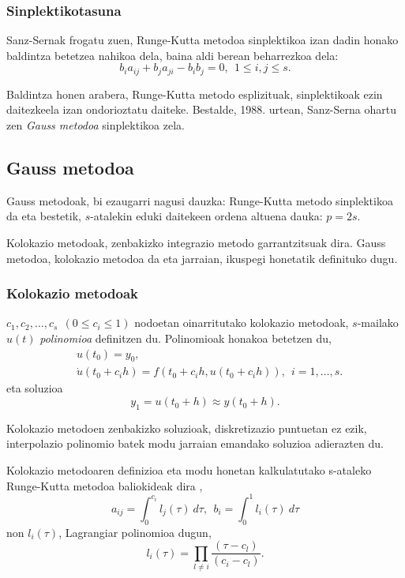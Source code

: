 \subsubsection*{Sinplektikotasuna}

Sanz-Sernak  \cite{JMSanz-Serna1994} frogatu zuen,  Runge-Kutta metodoa sinplektikoa izan dadin honako baldintza betetzea nahikoa dela, baina aldi berean beharrezkoa dela:
\begin{equation}
\label{eq:simplektik}
b_{i}a_{ij}+b_{j}a_{ji}-b_{i}b_{j}=0, \ \ 1 \leqslant i,j \leqslant s.
\end{equation}

Baldintza honen arabera, Runge-Kutta metodo esplizituak, sinplektikoak ezin daitezkeela izan ondorioztatu daiteke. Bestalde, 1988. urtean, Sanz-Serna \cite{JMSanz-Serna1994} ohartu zen \emph{Gauss metodoa} sinplektikoa zela. 

\subsection{Gauss metodoa}

Gauss metodoak, bi ezaugarri nagusi dauzka: Runge-Kutta metodo sinplektikoa da eta bestetik, $s$-atalekin eduki daitekeen ordena altuena  dauka: $p=2s$. 

Kolokazio metodoak, zenbakizko integrazio metodo garrantzitsuak dira. Gauss metodoa, kolokazio metodoa da eta jarraian, ikuspegi honetatik definituko dugu. 

\subsubsection*{Kolokazio metodoak}

$c_1,c_2,\dots,c_s \ \ (0\leq c_i \leq 1)$ nodoetan oinarritutako kolokazio metodoak, $s$-mailako $u(t)$  \emph{polinomioa} definitzen du. Polinomioak honakoa betetzen du,
\begin{align*}
&u(t_0) =y_0, \\
&\dot{u}(t_0+c_ih) =f(t_0+c_i h, u(t_0+c_i h)), \ \ i=1,\dots,s.
\end{align*}
eta soluzioa 
\begin{equation*}
y_1=u(t_0+h)\approx y(t_0+h).
\end{equation*} 

Kolokazio metodoen zenbakizko soluzioak, diskretizazio puntuetan ez ezik, interpolazio polinomio batek modu jarraian emandako soluzioa adierazten du. 

Kolokazio metodoaren definizioa eta modu honetan kalkulatutako s-ataleko Runge-Kutta metodoa baliokideak dira \cite{Hairer2006}, 
\begin{equation}
a_{ij}=\int_{0}^{c_i} l_j(\tau) \ d\tau, \ \ b_i=\int_{0}^{1} l_i(\tau) \ d\tau
\end{equation}
%
non $l_i(\tau)$, Lagrangiar polinomioa dugun,
\begin{equation}
l_i(\tau)=\prod_{l\neq i} \frac{(\tau-c_l)}{(c_i-c_l)}.
\end{equation}
 
